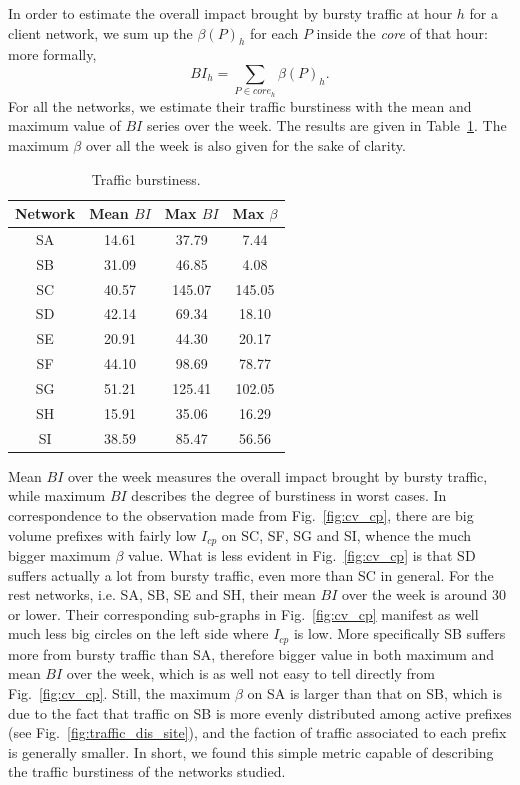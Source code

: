 In order to estimate the overall impact brought by bursty traffic at hour $h$ for a client network, we sum up the $\beta(P)_h$ for each $P$ inside the \textit{core} of that hour: more formally, 
\begin{equation*}
BI_h = \sum_{P \in \textit{core}_h} \beta(P)_h.
\label{eq:bi}
\end{equation*}
For all the networks, we estimate their traffic burstiness with the mean and maximum value of $BI$ series over the week. The results are given in Table~\ref{tab:bi}. The maximum $\beta$ over all the week is also given for the sake of clarity.
\begin{table}[!tb]
\centering
\begin{tabular}{cccc}\toprule
\textbf{Network} & \textbf{Mean $BI$} & \textbf{Max $BI$} & \textbf{Max $\beta$}\\
\midrule
SA & 14.61 & 37.79  &  7.44\\
SB & 31.09 & 46.85  &  4.08\\
SC & 40.57 & 145.07 &  145.05\\
SD & 42.14 & 69.34  &  18.10\\
SE & 20.91 & 44.30  &  20.17\\
SF & 44.10 & 98.69  &  78.77\\
SG & 51.21 & 125.41 &  102.05\\
SH & 15.91 & 35.06  &  16.29\\
SI & 38.59 & 85.47  &  56.56\\
\bottomrule
\end{tabular}
\caption{Traffic burstiness.}
\label{tab:bi}
\end{table}

Mean $BI$ over the week measures the overall impact brought by bursty traffic, while maximum $BI$ describes the degree of burstiness in worst cases.
In correspondence to the observation made from Fig.~\ref{fig:cv_cp}, there are big volume prefixes with fairly low $I_{cp}$ on SC, SF, SG and SI, whence the much bigger maximum $\beta$ value.
What is less evident in Fig.~\ref{fig:cv_cp} is that SD suffers actually a lot from bursty traffic, even more than SC in general.
For the rest networks, i.e. SA, SB, SE and SH, their mean $BI$ over the week is around 30 or lower. Their corresponding sub-graphs in Fig.~\ref{fig:cv_cp} manifest as well much less big circles on the left side where $I_{cp}$ is low.
More specifically SB suffers more from bursty traffic than SA, therefore bigger value in both maximum and mean $BI$ over the week, which is as well not easy to tell directly from Fig.~\ref{fig:cv_cp}.
Still, the maximum $\beta$ on SA is larger than that on SB, which is due to the fact that traffic on SB is more evenly distributed among active prefixes (see Fig.~\ref{fig:traffic_dis_site}), and the faction of traffic associated to each prefix is generally smaller.
In short, we found this simple metric capable of describing the traffic burstiness of the networks studied.





